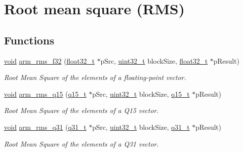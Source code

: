 \hypertarget{group___r_m_s}{\section{Root mean square (R\-M\-S)}
\label{group___r_m_s}
}
\subsection*{Functions}
\begin{DoxyCompactItemize}
\item 
\hyperlink{group___n_a_m_e_ga18028b8badbf1ea7e704ccac3c488e82}{void} \hyperlink{group___r_m_s_ga0e3ab1b57da32d45388d1fa90d7fd88c}{arm\-\_\-rms\-\_\-f32} (\hyperlink{arm__math_8h_a4611b605e45ab401f02cab15c5e38715}{float32\-\_\-t} $\ast$p\-Src, \hyperlink{stdint_8h_a435d1572bf3f880d55459d9805097f62}{uint32\-\_\-t} block\-Size, \hyperlink{arm__math_8h_a4611b605e45ab401f02cab15c5e38715}{float32\-\_\-t} $\ast$p\-Result)
\begin{DoxyCompactList}\small\item\em Root Mean Square of the elements of a floating-\/point vector. \end{DoxyCompactList}\item 
\hyperlink{group___n_a_m_e_ga18028b8badbf1ea7e704ccac3c488e82}{void} \hyperlink{group___r_m_s_gaf5b836b72dda9e5dfbbd17c7906fd13f}{arm\-\_\-rms\-\_\-q15} (\hyperlink{arm__math_8h_ab5a8fb21a5b3b983d5f54f31614052ea}{q15\-\_\-t} $\ast$p\-Src, \hyperlink{stdint_8h_a435d1572bf3f880d55459d9805097f62}{uint32\-\_\-t} block\-Size, \hyperlink{arm__math_8h_ab5a8fb21a5b3b983d5f54f31614052ea}{q15\-\_\-t} $\ast$p\-Result)
\begin{DoxyCompactList}\small\item\em Root Mean Square of the elements of a Q15 vector. \end{DoxyCompactList}\item 
\hyperlink{group___n_a_m_e_ga18028b8badbf1ea7e704ccac3c488e82}{void} \hyperlink{group___r_m_s_gae33015fda23fc44e7ead5e5ed7e8d314}{arm\-\_\-rms\-\_\-q31} (\hyperlink{arm__math_8h_adc89a3547f5324b7b3b95adec3806bc0}{q31\-\_\-t} $\ast$p\-Src, \hyperlink{stdint_8h_a435d1572bf3f880d55459d9805097f62}{uint32\-\_\-t} block\-Size, \hyperlink{arm__math_8h_adc89a3547f5324b7b3b95adec3806bc0}{q31\-\_\-t} $\ast$p\-Result)
\begin{DoxyCompactList}\small\item\em Root Mean Square of the elements of a Q31 vector. \end{DoxyCompactList}\end{DoxyCompactItemize}


